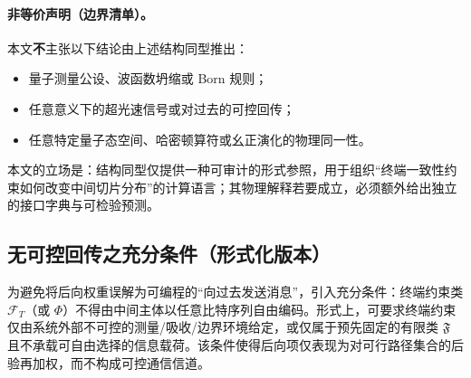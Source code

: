 \paragraph{非等价声明（边界清单）。}
\AuditTag 本文\textbf{不}主张以下结论由上述结构同型推出：
\begin{itemize}
  \item 量子测量公设、波函数坍缩或 Born 规则；
  \item 任意意义下的超光速信号或对过去的可控回传；
  \item 任意特定量子态空间、哈密顿算符或幺正演化的物理同一性。
\end{itemize}
本文的立场是：结构同型仅提供一种可审计的形式参照，用于组织“终端一致性约束如何改变中间切片分布”的计算语言；其物理解释若要成立，必须额外给出独立的接口字典与可检验预测。

\subsection{无可控回传之充分条件（形式化版本）}

为避免将后向权重误解为可编程的“向过去发送消息”，引入充分条件：终端约束类 $\mathcal F_T$（或 $\Phi$）不得由中间主体以任意比特序列自由编码。形式上，可要求终端约束仅由系统外部不可控的测量/吸收/边界环境给定，或仅属于预先固定的有限类 $\mathfrak F$ 且不承载可自由选择的信息载荷。该条件使得后向项仅表现为对可行路径集合的后验再加权，而不构成可控通信信道。

